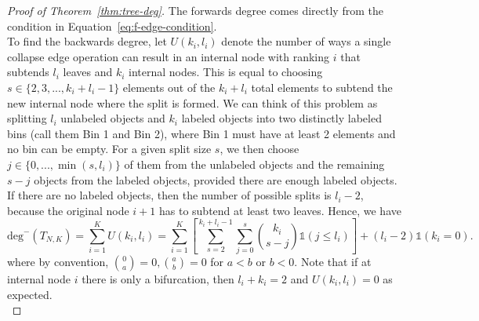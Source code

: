\documentclass{article}
\begin{document}
\begin{proof}[Proof of Theorem~\ref{thm:tree-deg}]
The forwards degree comes directly from the condition in Equation~\ref{eq:f-edge-condition}. \\ 

\noindent To find the backwards degree, let $U(k_i, l_i)$ denote the number of ways a single collapse edge operation can result in an internal node with ranking $i$ that subtends $l_i$ leaves and $k_i$ internal nodes. This is equal to choosing $s \in \{2, 3,..., k_i+l_i-1\}$ elements out of the $k_i+l_i$ total elements to subtend the new internal node where the split is formed. We can think of this problem as splitting $l_i$ unlabeled objects and $k_i$ labeled objects into two distinctly labeled bins (call them Bin 1 and Bin 2), where Bin 1 must have at least 2 elements and no bin can be empty. For a given split size $s$, we then choose $j \in \{0,..., \min(s, l_i)\}$ of them from the unlabeled objects and the remaining $s-j$ objects from the labeled objects, provided there are enough labeled objects. If there are no labeled objects, then the number of possible splits is $l_i-2$, because the original node $i+1$ has to subtend at least two leaves. Hence, we have 
\begin{equation} \label{eq:backwards_degree}
    \text{deg}^-(T_{N,K}) = \sum_{i=1}^K U(k_i, l_i) = \sum_{i=1}^K \left [ \sum_{s=2}^{k_i+l_i-1}  \sum_{j=0}^s  \binom{k_i}{s-j} \mathds{1}(j \leq l_i ) \right ]  + (l_i-2) \mathds{1}(k_i=0) . 
\end{equation}
where by convention, $\binom{0}{a}=0, \binom{a}{b}=0$ for $a < b$ or $b <0$. Note that if at internal node $i$ there is only a bifurcation, then $l_i+ k_i=2$ and $U(k_i, l_i)=0$ as expected. \\


\end{proof}
\end{document}
